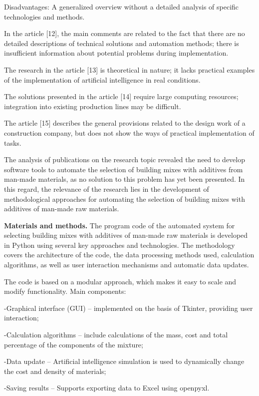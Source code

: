 {Disadvantages: A generalized overview without a detailed analysis of
specific technologies and methods.

In the article {[}12{]}, the main comments are related to the fact that
there are no detailed descriptions of technical solutions and automation
methods; there is insufficient information about potential problems
during implementation.

The research in the article {[}13{]} is theoretical in nature; it lacks
practical examples of the implementation of artificial intelligence in
real conditions.

The solutions presented in the article {[}14{]} require large computing
resources; integration into existing production lines may be difficult.

The article {[}15{]} describes the general provisions related to the
design work of a construction company, but does not show the ways of
practical implementation of tasks.

The analysis of publications on the research topic revealed the need to
develop software tools to automate the selection of building mixes with
additives from man-made materials, as no solution to this problem has
yet been presented. In this regard, the relevance of the research lies
in the development of methodological approaches for automating the
selection of building mixes with additives of man-made raw materials.

{\bfseries Materials and methods.} The program code of the automated system
for selecting building mixes with additives of man-made raw materials is
developed in Python using several key approaches and technologies. The
methodology covers the architecture of the code, the data processing
methods used, calculation algorithms, as well as user interaction
mechanisms and automatic data updates.

The code is based on a modular approach, which makes it easy to scale
and modify functionality. Main components:

-Graphical interface (GUI) -- implemented on the basis of Tkinter,
providing user interaction;

-Calculation algorithms -- include calculations of the mass, cost and
total percentage of the components of the mixture;

-Data update -- Artificial intelligence simulation is used to
dynamically change the cost and density of materials;

-Saving results -- Supports exporting data to Excel using openpyxl.

}
